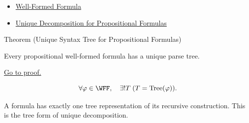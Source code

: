 \begin{dependencies}
\begin{itemize}
  \item \hyperref[def:well-formed-formula]{Well-Formed Formula}
  \item \hyperref[thm:unique-decomposition-propositional-formulas]{Unique Decomposition for Propositional Formulas}
\end{itemize}
\end{dependencies}
\begin{theorembox}{Theorem (Unique Syntax Tree for Propositional Formulas)}
\begin{theorem}
\label{thm:unique-syntax-tree-propositional-formulas}
Every propositional well-formed formula has a unique parse tree.

\noindent\hyperref[prf:unique-syntax-tree-propositional-formulas]{Go to proof.}
\end{theorem}
\end{theorembox}

\begin{remark*}
\[
\forall\varphi\in\WFF,\quad \exists!T\; (T=\operatorname{Tree}(\varphi)).
\]
\end{remark*}

\begin{remark*}[Interpretation]
A formula has exactly one tree representation of its recursive construction. This is the tree form of unique decomposition.
\end{remark*}


